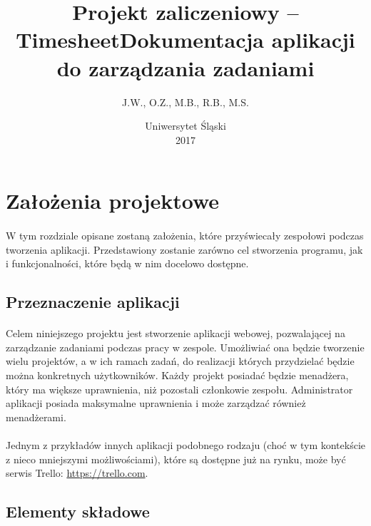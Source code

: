 \documentclass[a4paper, 12pt, oneside]{article}
\title{\textbf{Projekt zaliczeniowy -- Timesheet}\linebreak Dokumentacja aplikacji do zarządzania zadaniami}
\author{J.W., O.Z., M.B., R.B., M.S.}
\date{Uniwersytet Śląski\\2017}
\begin{document}

\maketitle
\thispagestyle{empty}

\newpage


\tableofcontents
\newpage


\section{Założenia projektowe}
\paragraph{} W tym rozdziale opisane zostaną założenia, które przyświecały zespołowi podczas tworzenia aplikacji. Przedstawiony zostanie zarówno cel stworzenia programu, jak i funkcjonalności, które będą w nim docelowo dostępne.
	\subsection{Przeznaczenie aplikacji}
		\paragraph{}Celem niniejszego projektu jest stworzenie aplikacji webowej, pozwalającej na zarządzanie zadaniami podczas pracy w zespole. Umożliwiać ona będzie tworzenie wielu projektów, a w ich ramach zadań, do realizacji których przydzielać będzie można konkretnych użytkowników. Każdy projekt posiadać będzie menadżera, który ma większe uprawnienia, niż pozostali członkowie zespołu. Administrator aplikacji posiada maksymalne uprawnienia i może zarządzać również menadżerami.
		\paragraph{}Jednym z przykładów innych aplikacji podobnego rodzaju (choć w tym kontekście z nieco mniejszymi możliwościami), które są dostępne już na rynku, może być serwis Trello: \url{https://trello.com}.
	\subsection{Elementy składowe}
\end{document}
